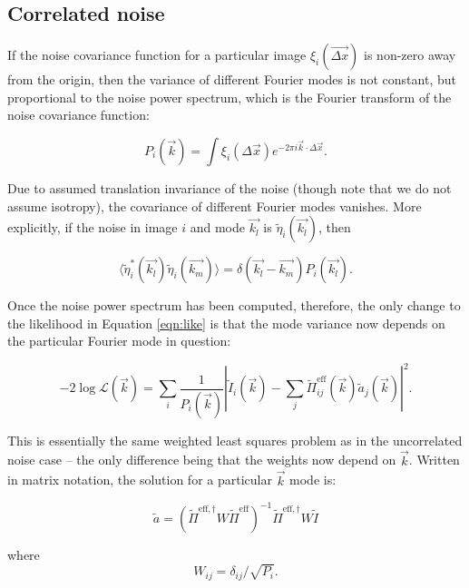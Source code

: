 \documentclass{article}
\begin{document}
\subsection{Correlated noise}

If the noise covariance function for a particular image $\xi_i(\vec{\Delta x})$ is non-zero away
from the origin, then the variance of different Fourier modes is not constant, but proportional to
the noise power spectrum, which is the Fourier transform of the noise covariance function:

\begin{equation}
  P_i(\vec{k}) = \int \xi_i(\Delta \vec{x}) e^{-2 \pi i \vec{k}\cdot\Delta\vec{x}}.
\end{equation}

Due to assumed translation invariance of the noise (though note that we do not assume isotropy), the
covariance of different Fourier modes vanishes.  More explicitly, if the noise in image $i$ and mode
$\vec{k_l}$ is $\tilde\eta_i(\vec{k_l})$, then

\begin{equation}
  \langle\tilde\eta_i^*(\vec{k_l})\tilde\eta_i(\vec{k_m})\rangle = \delta(\vec{k_l} - \vec{k_m})P_i(\vec{k_l}).
\end{equation}

Once the noise power spectrum has been computed, therefore, the only change to the likelihood in
Equation \ref{eqn:like} is that the mode variance now depends on the particular Fourier mode in
question:

\begin{equation}
    \label{eqn:likecorr}
    -2 \log \mathcal{L}(\vec{k}) = \sum_i\frac{1}{P_i(\vec{k})}\left|\tilde{I}_i(\vec{k}) - \sum_j \tilde{\Pi}^\mathrm{eff}_{ij}(\vec{k}) \tilde{a}_j(\vec{k})\right|^2.
\end{equation}

This is essentially the same weighted least squares problem as in the uncorrelated noise case -- the
only difference being that the weights now depend on $\vec{k}$.  Written in matrix notation, the
solution for a particular $\vec{k}$ mode is:

\begin{equation}
    \tilde{a} = \left(\tilde{\Pi}^{\mathrm{eff}, \dagger} W \tilde{\Pi}^\mathrm{eff} \right)^{-1} \tilde{\Pi}^{\mathrm{eff}, \dagger} W \tilde{I}
\end{equation}

where
\begin{equation}
    W_{ij} = \delta_{ij}/\sqrt{P_i}.
\end{equation}
\end{document}
